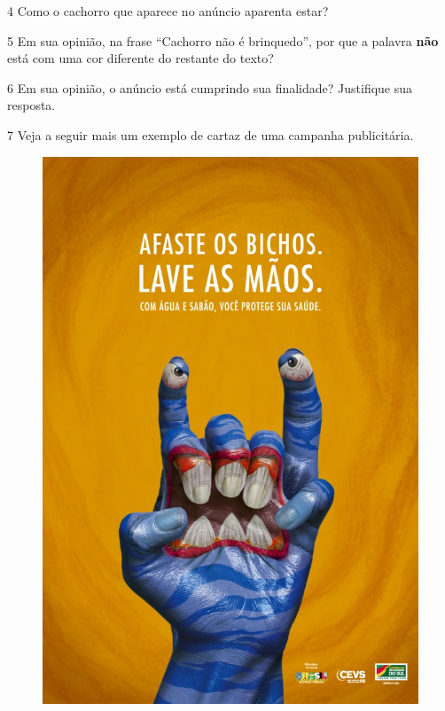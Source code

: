 
\num{4} Como o cachorro que aparece no anúncio aparenta estar?



\num{5} Em sua opinião, na frase ``Cachorro não é brinquedo'', por que a palavra \textbf{não} está com uma cor diferente do restante do texto?


\num{6} Em sua opinião, o anúncio está cumprindo sua finalidade? Justifique
sua resposta. 


\num{7} Veja a seguir mais um exemplo de cartaz de uma campanha publicitária.


\begin{figure}[htpb!]
\centering
\includegraphics[width=.7\textwidth]{./media/image10.jpeg}
\end{figure}

